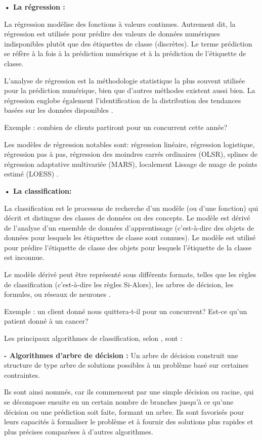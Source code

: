 \textbf{• La régression :} 

La régression modélise des fonctions à valeurs continues. Autrement dit, la régression est utilisée pour prédire des valeurs de données numériques indisponibles plutôt que des étiquettes de classe (discrètes). Le terme prédiction se réfère à la fois à la prédiction numérique et à la prédiction de l'étiquette de classe.

L'analyse de régression est la méthodologie statistique la plus souvent utilisée pour la prédiction numérique, bien que d'autres méthodes existent aussi bien. La régression englobe également l'identification de la distribution des tendances basées sur les données disponibles \cite{Han}.

Exemple : combien de clients partiront pour un concurrent cette année? 

Les modèles de régression notables sont: régression linéaire, régression logistique, régression pas à pas, régression des moindres carrés ordinaires (OLSR), splines de régression adaptative multivariée (MARS), localement Lissage de nuage de points estimé (LOESS) \cite{surveymachinelearningregression}.

\textbf{• La classification:}

La classification est le processus de recherche d'un modèle (ou d'une fonction) qui décrit et distingue des classes de données ou des concepts. Le modèle est dérivé de l'analyse d'un ensemble de données d'apprentissage (c'est-à-dire des objets de données pour lesquels les étiquettes de classe sont connues). Le modèle est utilisé pour prédire l'étiquette de classe des objets pour lesquels l'étiquette de la classe est inconnue.

Le modèle dérivé peut être représenté sous différents formats, telles que les règles de classification (c'est-à-dire les règles Si-Alors), les arbres de décision, les formules, ou réseaux de neurones \cite{Han}. 

Exemple : un client donné nous quittera-t-il pour un concurrent? Est-ce qu'un patient donné à un cancer?

Les principaux algorithmes de classification, selon \cite{surveymachinelearningregression}, sont :

\textbf{- Algorithmes d'arbre de décision :} Un arbre de décision construit une structure de type arbre de solutions possibles à un problème basé sur certaines contraintes.

Ils sont ainsi nommés, car ils commencent par une simple décision ou racine, qui se décompose ensuite en un certain nombre de branches jusqu'à ce qu'une décision ou une prédiction soit faite, formant un arbre. Ils sont favorisés pour leurs capacités à formaliser le problème et à fournir des solutions plus rapides et plus précises comparéses à d'autres algorithmes. 

